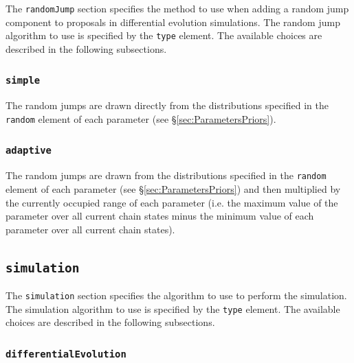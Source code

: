 The {\tt randomJump} section specifies the method to use when adding a random jump component to proposals in differential evolution simulations. The random jump algorithm to use is specified by the {\tt type} element. The available choices are described in the following subsections.

\subsubsection{{\tt simple}}

The random jumps are drawn directly from the distributions specified in the {\tt random} element of each parameter (see \S\ref{sec:ParametersPriors}).

\subsubsection{{\tt adaptive}}

The random jumps are drawn from the distributions specified in the {\tt random} element of each parameter (see \S\ref{sec:ParametersPriors}) and then multiplied by the currently occupied range of each parameter (i.e. the maximum value of the parameter over all current chain states minus the minimum value of each parameter over all current chain states).

\subsection{{\tt simulation}}

The {\tt simulation} section specifies the algorithm to use to perform the simulation. The simulation algorithm to use is specified by the {\tt type} element. The available choices are described in the following subsections.

\subsubsection{{\tt differentialEvolution}}

